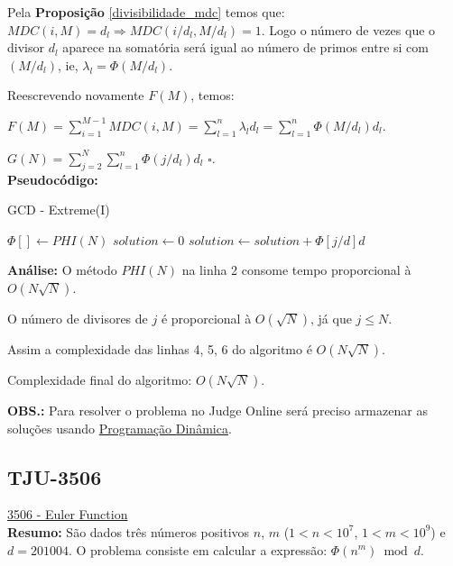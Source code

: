 Pela \textbf{Proposição} \autoref{divisibilidade_mdc} temos que: $MDC(i,M) = d_l \Rightarrow MDC(i/d_l,M/d_l) = 1$. Logo o número de vezes que o divisor $d_l$ aparece na somatória será igual ao número de primos entre si com $(M/d_l)$, ie, $\lambda_l = \Phi(M/d_l)$.

Reescrevendo novamente $F(M)$, temos:

$F(M) = \sum_{i=1}^{M-1}MDC(i, M) = \sum_{l=1}^n \lambda_l d_l = \sum_{l=1}^n \Phi(M/d_l) d_l$.

$G(N) = \sum_{j=2}^N \sum_{l=1}^n \Phi(j/d_l)d_l$ $\square$.
\\

\textbf{Pseudocódigo:}
\begin{algorithm}
\caption{GCD - Extreme(I)}\label{gcd_extreme}
\begin{algorithmic}[1]
\State $\Phi[] \gets PHI(N)$
\State $solution \gets 0$
\State $solution \gets solution + \Phi[j/d] d$
\EndFor
\EndFor
\State {}
\EndProcedure
\end{algorithmic}
\end{algorithm}


\textbf{Análise:}
O método $PHI(N)$ na linha 2 consome tempo proporcional à $O(N\sqrt{N})$.

O número de divisores de $j$ é proporcional à $O(\sqrt{N})$, já que $j \leq N$.

Assim a complexidade das linhas 4, 5, 6 do algoritmo é $O(N\sqrt{N})$.

Complexidade final do algoritmo: $O(N\sqrt{N})$.

\textbf{OBS.:} Para resolver o problema no Judge Online será preciso armazenar as soluções usando \href{https://linux.ime.usp.br/~stefanot/mac499/template.pdf}{Programação Dinâmica}.






\subsection{TJU-3506}
\href{http://acm.tju.edu.cn/toj/showp3506.html}{3506 - Euler Function} \\

\textbf{Resumo:}
São dados três números positivos $n$, $m$ ($1 < n < 10^7$, $1 < m < 10^9$) e $d = 201004$.
O problema consiste em calcular a expressão: $\Phi(n^m) \bmod d$.
\\


